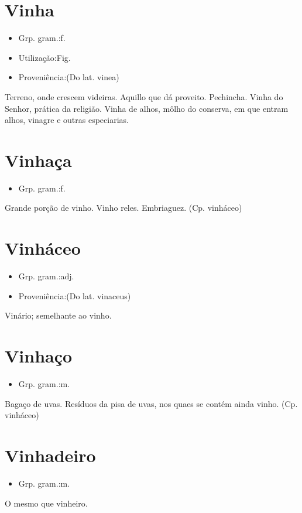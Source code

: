 \documentclass{article}
\begin{document}
\section{Vinha}
\begin{itemize}
\item {Grp. gram.:f.}
\end{itemize}
\begin{itemize}
\item {Utilização:Fig.}
\end{itemize}
\begin{itemize}
\item {Proveniência:(Do lat. \textunderscore vinea\textunderscore )}
\end{itemize}
Terreno, onde crescem videiras.
Aquillo que dá proveito.
Pechincha.
\textunderscore Vinha do Senhor\textunderscore , prática da religião.
\textunderscore Vinha de alhos\textunderscore , môlho do conserva, em que entram alhos, vinagre e outras especiarias.
\section{Vinhaça}
\begin{itemize}
\item {Grp. gram.:f.}
\end{itemize}
Grande porção de vinho.
Vinho reles.
Embriaguez.
(Cp. \textunderscore vinháceo\textunderscore )
\section{Vinháceo}
\begin{itemize}
\item {Grp. gram.:adj.}
\end{itemize}
\begin{itemize}
\item {Proveniência:(Do lat. \textunderscore vinaceus\textunderscore )}
\end{itemize}
Vinário; semelhante ao vinho.
\section{Vinhaço}
\begin{itemize}
\item {Grp. gram.:m.}
\end{itemize}
Bagaço de uvas.
Resíduos da pisa de uvas, nos quaes se contém ainda vinho.
(Cp. \textunderscore vinháceo\textunderscore )
\section{Vinhadeiro}
\begin{itemize}
\item {Grp. gram.:m.}
\end{itemize}
O mesmo que \textunderscore vinheiro\textunderscore .
\end{document}
